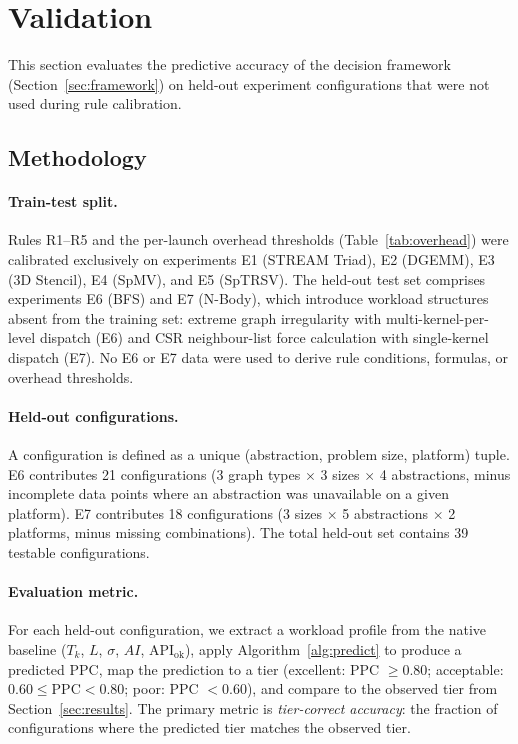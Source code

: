 
\section{Validation}
\label{sec:validation}

This section evaluates the predictive accuracy of the decision framework
(Section~\ref{sec:framework}) on held-out experiment configurations that
were not used during rule calibration.

\subsection{Methodology}
\label{subsec:val_methodology}

\paragraph{Train-test split.}
Rules R1--R5 and the per-launch overhead thresholds
(Table~\ref{tab:overhead}) were calibrated exclusively on experiments
E1 (STREAM Triad), E2 (DGEMM), E3 (3D Stencil), E4 (SpMV), and E5
(SpTRSV). The held-out test set comprises experiments E6 (BFS) and E7
(N-Body), which introduce workload structures absent from the training
set: extreme graph irregularity with multi-kernel-per-level dispatch (E6)
and CSR neighbour-list force calculation with single-kernel dispatch (E7).
No E6 or E7 data were used to derive rule conditions, formulas, or
overhead thresholds.

\paragraph{Held-out configurations.}
A configuration is defined as a unique (abstraction, problem size, platform)
tuple. E6 contributes 21 configurations (3 graph types $\times$ 3 sizes
$\times$ 4 abstractions, minus incomplete data points where an abstraction
was unavailable on a given platform). E7 contributes 18 configurations
(3 sizes $\times$ 5 abstractions $\times$ 2 platforms, minus missing
combinations). The total held-out set contains 39 testable configurations.

\paragraph{Evaluation metric.}
For each held-out configuration, we extract a workload profile from
the native baseline ($T_k$, $L$, $\sigma$, $AI$, $\text{API}_{\text{ok}}$),
apply Algorithm~\ref{alg:predict} to produce a predicted PPC, map the
prediction to a tier (excellent: PPC $\geq 0.80$; acceptable:
$0.60 \leq \text{PPC} < 0.80$; poor: PPC $< 0.60$), and compare to the
observed tier from Section~\ref{sec:results}. The primary metric is
\emph{tier-correct accuracy}: the fraction of configurations where the
predicted tier matches the observed tier.

